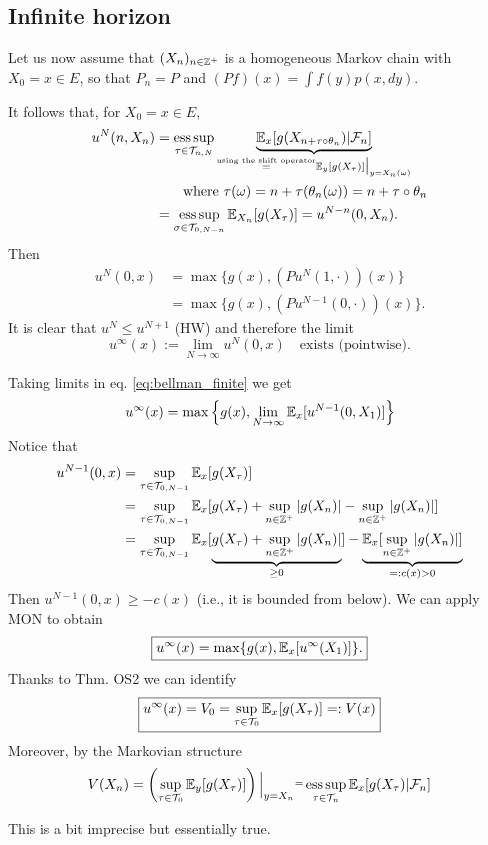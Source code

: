 \subsection{Infinite horizon}
Let us now assume that $(X_n)_{n \in \mathbb Z^+}$ is a homogeneous Markov chain with $X_0 = x \in E$, so that $P_n = P$ and $(Pf)(x) = \int f(y) p(x, dy)$.

It follows that, for $X_0 = x \in E$,
\begin{align*}
    u^N(n, X_n) &= \operatorname*{ess\,sup}_{\tau \in \mathcal{T}_{n,N}} \underbrace{\mathbb E_x [g(X_{n+\tau \circ \theta_n}) | \mathcal{F}_n]}_{\overset{\text{using the shift operator}}{=} \mathbb E_y [g(X_\tau)] \big|_{y=X_n(\omega)}} \\
    &\qquad \text{where } \tau(\omega) = n + \tau(\theta_n(\omega)) = n + \tau \circ \theta_n \\
    &= \operatorname*{ess\,sup}_{\sigma \in \mathcal{T}_{0, N-n}} \mathbb E_{X_n} [g(X_\tau)] = u^{N-n}(0, X_n).
\end{align*}
Then
\begin{align}
    u^N(0, x) &= \max \{g(x), (P u^N(1, \cdot))(x)\} \nonumber \\
    &= \max \{g(x), (P u^{N-1}(0, \cdot))(x)\}. \label{eq:bellman_finite} \tag{1}
\end{align}
It is clear that $u^N \le u^{N+1}$ (HW) and therefore the limit
$$u^\infty(x) := \lim_{N \to \infty} u^N(0, x) \quad \text{exists (pointwise)}.$$

Taking limits in eq. \eqref{eq:bellman_finite} we get
$$u^\infty(x) = \max \left\{ g(x), \lim_{N \to \infty} \mathbb E_x [u^{N-1}(0, X_1)] \right\}$$
Notice that
\begin{align*}
    u^{N-1}(0, x) &= \sup_{\tau \in \mathcal{T}_{0, N-1}} \mathbb E_x [g(X_\tau)] \\
    &= \sup_{\tau \in \mathcal{T}_{0, N-1}} \mathbb E_x [g(X_\tau) + \sup_{n \in \mathbb Z^+} |g(X_n)| - \sup_{n \in \mathbb Z^+} |g(X_n)|] \\
    &= \sup_{\tau \in \mathcal{T}_{0, N-1}} \mathbb E_x [\underbrace{g(X_\tau) + \sup_{n \in \mathbb Z^+} |g(X_n)|}_{\ge 0}] - \underbrace{\mathbb E_x [\sup_{n \in \mathbb Z^+} |g(X_n)|]}_{=: c(x) > 0}
\end{align*}
Then $u^{N-1}(0, x) \ge -c(x)$ (i.e., it is bounded from below).
We can apply MON to obtain
\begin{equation*}
    \boxed{u^\infty(x) = \max \{g(x), \mathbb E_x [u^\infty(X_1)]\}.}
\end{equation*}
Thanks to Thm. OS2 we can identify
\begin{equation*}
    \boxed{u^\infty(x) = V_0 = \sup_{\tau \in \mathcal{T}_0} \mathbb E_x [g(X_\tau)] =: V(x)}
\end{equation*}
Moreover, by the Markovian structure
$$V(X_n) = \left( \sup_{\tau \in \mathcal{T}_0} \mathbb E_y [g(X_\tau)] \right) \Big|_{y=X_n} \overset{\text{=}}{} \operatorname*{ess\,sup}_{\tau \in \mathcal{T}_n} \mathbb E_x [g(X_\tau) | \mathcal{F}_n]$$

\begin{remark}
    This is a bit imprecise but essentially true.
\end{remark}